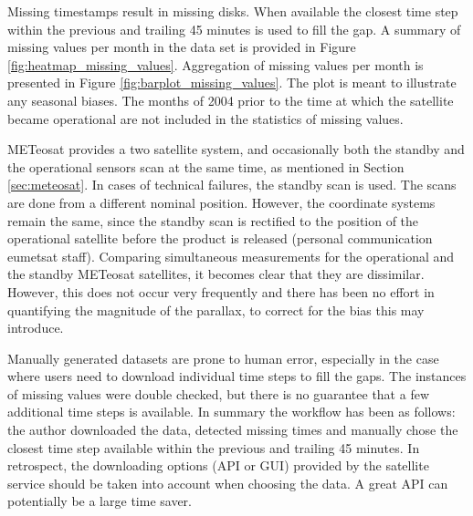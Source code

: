 Missing timestamps result in missing disks. When available the closest time step within the previous and trailing 45 minutes is used to fill the gap. A summary of missing values per month in the data set is provided in Figure \ref{fig:heatmap_missing_values}. Aggregation of missing values per month is presented in Figure \ref{fig:barplot_missing_values}. The plot is meant to illustrate any seasonal biases. The months of 2004 prior to the time at which the satellite became operational are not included in the statistics of missing values.

METeosat provides a two satellite system, and occasionally both the standby and the operational sensors scan at the same time, as mentioned in Section \ref{sec:meteosat}.
In cases of technical failures, the standby scan is used. The scans are done from a different nominal position. However, the coordinate systems remain the same, since the standby scan is rectified to the position of the operational satellite before the product is released (personal communication \acrshort{eumetsat} staff). Comparing simultaneous measurements for the operational and the standby METeosat satellites, it becomes clear that they are dissimilar. However, this does not occur very frequently and there has been no effort in quantifying the magnitude of the parallax, to correct for the bias this may introduce.

Manually generated datasets are prone to human error, especially in the case where users need to download individual time steps to fill the gaps. The instances of missing values were double checked, but there is no guarantee that a few additional time steps is available. In summary the workflow has been as follows: the author downloaded the data, detected missing times and manually chose the closest time step available within the previous and trailing 45 minutes. In retrospect, the downloading options (API or GUI) provided by the satellite service should be taken into account when choosing the data. A great API can potentially be a large time saver.

